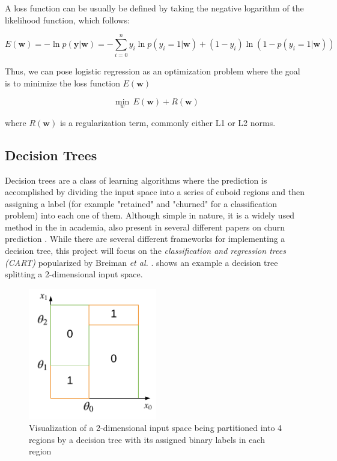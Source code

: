 \documentclass{kththesis}
\begin{document}
A loss function can be usually be defined by taking the negative logarithm of the likelihood function, which follows:

\begin{equation}
E(\mathbf{w}) = -\ln p(\mathbf{y}|\mathbf{w}) = - \sum_{i=0}^{n} y_i \ln p(y_i=1|\mathbf{w}) + (1-y_i) \ln (1 - p(y_i=1|\mathbf{w}))
\end{equation}

Thus, we can pose logistic regression as an optimization problem where the goal is to minimize the loss function $E(\mathbf{w})$ 

\begin{equation}
\displaystyle{\min_w}\, E(\mathbf{w}) + R(\mathbf{w})
\end{equation}

where $R(\mathbf{w})$ is a regularization term, commonly either L1 or L2 norms.

\subsection{Decision Trees}
Decision trees are a class of learning algorithms where the prediction is accomplished by dividing the input space into a series of cuboid regions and then assigning a label (for example "retained" and "churned" for a classification problem) into each one of them. Although simple in nature, it is a widely used method in the in academia, also present in several different papers on churn prediction \citep{Pudipeddi2014}\citep{Hassouna2015} \citep{Ballings2012} \citep{Khan2015}. While there are several different frameworks for implementing a decision tree, this project will focus on the \emph{classification and regression trees (CART)} popularized by Breiman \emph{et al.} \citep{breiman1984classification}.  shows an example a decision tree splitting a 2-dimensional input space.  

\begin{figure}[h]
    \centering
    \includegraphics[width=0.5\textwidth,keepaspectratio]{figures/dectree.pdf}
    \caption{Visualization of a 2-dimensional input space being partitioned into 4 regions by a decision tree with its assigned binary labels in each region}
    \label{fig:dectree}
\end{figure}
\end{document}
